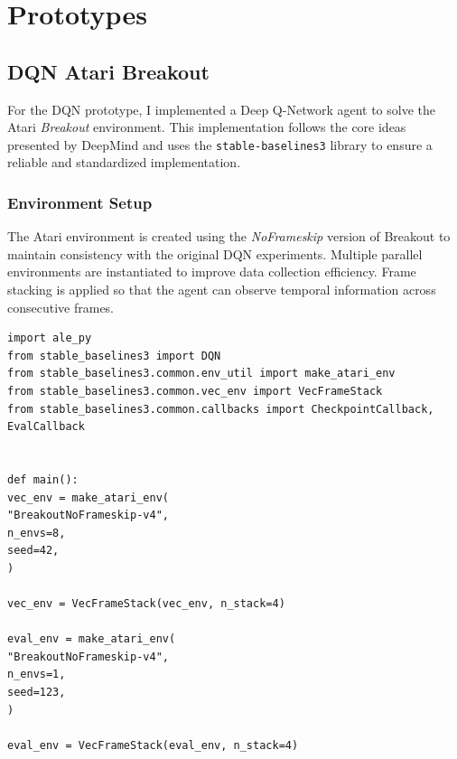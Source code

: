 

\newpage
\section{Prototypes}

\subsection{DQN Atari Breakout}

For the DQN prototype, I implemented a Deep Q-Network agent to solve the Atari \textit{Breakout} environment. This implementation follows the core ideas presented by DeepMind and uses the \texttt{stable-baselines3} library to ensure a reliable and standardized implementation.

\subsubsection{Environment Setup}

The Atari environment is created using the \textit{NoFrameskip} version of Breakout to maintain consistency with the original DQN experiments. Multiple parallel environments are instantiated to improve data collection efficiency. Frame stacking is applied so that the agent can observe temporal information across consecutive frames.

\begin{verbatim}
import ale_py
from stable_baselines3 import DQN
from stable_baselines3.common.env_util import make_atari_env
from stable_baselines3.common.vec_env import VecFrameStack
from stable_baselines3.common.callbacks import CheckpointCallback, EvalCallback


def main():
vec_env = make_atari_env(
"BreakoutNoFrameskip-v4",
n_envs=8,
seed=42,
)

vec_env = VecFrameStack(vec_env, n_stack=4)

eval_env = make_atari_env(
"BreakoutNoFrameskip-v4",
n_envs=1,
seed=123,
)

eval_env = VecFrameStack(eval_env, n_stack=4)
\end{verbatim}

